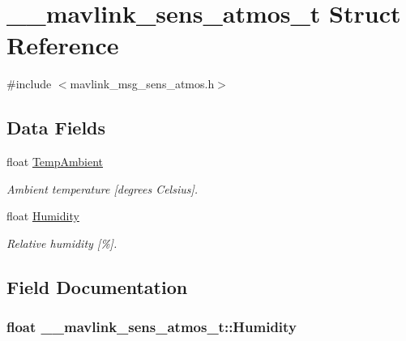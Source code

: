 \hypertarget{struct____mavlink__sens__atmos__t}{\section{\+\_\+\+\_\+mavlink\+\_\+sens\+\_\+atmos\+\_\+t Struct Reference}
\label{struct____mavlink__sens__atmos__t}
}


{\ttfamily \#include $<$mavlink\+\_\+msg\+\_\+sens\+\_\+atmos.\+h$>$}

\subsection*{Data Fields}
\begin{DoxyCompactItemize}
\item 
float \hyperlink{struct____mavlink__sens__atmos__t_ad31aa3dfd9a3f4f27b16ff1abe11830d}{Temp\+Ambient}
\begin{DoxyCompactList}\small\item\em Ambient temperature \mbox{[}degrees Celsius\mbox{]}. \end{DoxyCompactList}\item 
float \hyperlink{struct____mavlink__sens__atmos__t_ac1fa902a7b09b07dd3eab57278944c0a}{Humidity}
\begin{DoxyCompactList}\small\item\em Relative humidity \mbox{[}\%\mbox{]}. \end{DoxyCompactList}\end{DoxyCompactItemize}


\subsection{Field Documentation}
\hypertarget{struct____mavlink__sens__atmos__t_ac1fa902a7b09b07dd3eab57278944c0a}{
\subsubsection[{Humidity}]{\setlength{\rightskip}{0pt plus 5cm}float \+\_\+\+\_\+mavlink\+\_\+sens\+\_\+atmos\+\_\+t\+::\+Humidity}}\label{struct____mavlink__sens__atmos__t_ac1fa902a7b09b07dd3eab57278944c0a}


